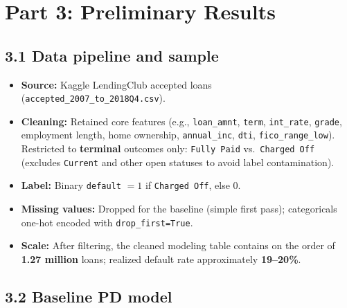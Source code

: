 \documentclass[12pt,letterpaper]{report}
\begin{document}
\section*{Part 3: Preliminary Results}

\subsection*{3.1 Data pipeline and sample}

\begin{itemize}
    \item \textbf{Source:} Kaggle LendingClub accepted loans (\texttt{accepted\_2007\_to\_2018Q4.csv}).
    \item \textbf{Cleaning:} Retained core features (e.g., \texttt{loan\_amnt}, \texttt{term}, \texttt{int\_rate}, \texttt{grade}, employment length, home ownership, \texttt{annual\_inc}, \texttt{dti}, \texttt{fico\_range\_low}). Restricted to \textbf{terminal} outcomes only: \texttt{Fully Paid} vs.\ \texttt{Charged Off} (excludes \texttt{Current} and other open statuses to avoid label contamination).
    \item \textbf{Label:} Binary \texttt{default} $= 1$ if \texttt{Charged Off}, else $0$.
    \item \textbf{Missing values:} Dropped for the baseline (simple first pass); categoricals one-hot encoded with \texttt{drop\_first=True}.
    \item \textbf{Scale:} After filtering, the cleaned modeling table contains on the order of \textbf{1.27 million} loans; realized default rate approximately \textbf{19--20\%}.
\end{itemize}

\subsection*{3.2 Baseline PD model}
\end{document}
